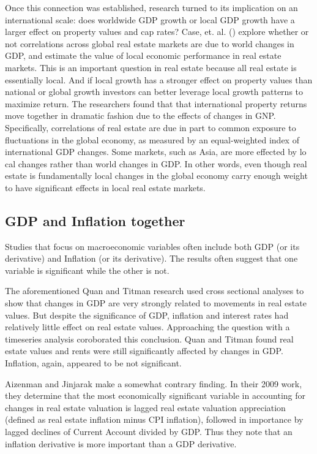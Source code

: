 Once this connection was established, research turned to its implication on an international scale: does worldwide GDP growth or local GDP growth have a larger effect on property values and cap rates? Case, et. al. (\citeyear{case2000global}) explore whether or not correlations across global real estate markets are due to world changes in GDP, and estimate the value of local economic performance in real estate markets. This is an important question in real estate because all real estate is essentially local. And if local growth has a stronger effect on property values than national or global growth investors can better leverage local growth patterns to maximize return. The researchers found that that international property returns move together in dramatic fashion due to the effects of changes in GNP. Specifically, correlations of real estate are due in part to common exposure to fluctuations in the global economy, as measured by an equal-weighted index of international GDP changes. Some markets, such as Asia, are more effected by lo cal changes rather than world changes in GDP. In other words, even though real estate is fundamentally local changes in the global economy carry enough weight to have significant effects in local real estate markets.

\subsection{GDP and Inflation together}

Studies that focus on macroeconomic variables often include both GDP (or its derivative) and Inflation (or its derivative). The results often suggest that one variable is significant while the other is not. 

The aforementioned Quan and Titman research used cross sectional analyses to show that changes in GDP are very strongly related to movements in real estate values. But despite the significance of GDP, inflation and interest rates had relatively little effect on real estate values. Approaching the question with a timeseries analysis coroborated this conclusion. Quan and Titman found real estate values and rents were still significantly affected by changes in GDP. Inflation, again, appeared to be not significant. 

Aizenman and Jinjarak make a somewhat contrary finding. In their 2009 work, \citep*{aizenman2009current} they determine that the most economically significant variable in accounting for changes in real estate valuation is lagged real estate valuation appreciation (defined as real estate inflation minus CPI inflation), followed in importance by lagged declines of Current Account divided by GDP. Thus they note that an inflation derivative is more important than a GDP derivative. 

